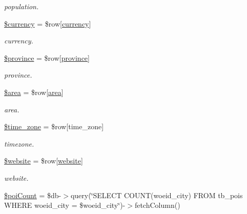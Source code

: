 \begin{DoxyCompactItemize}
\begin{DoxyCompactList}\small\item\em population. \end{DoxyCompactList}\item 
\mbox{\hyperlink{rotterdam_2index_8php_a37d22fd3b896e9d5488f3479a4d8f451}{\$currency}} = \$row\mbox{[}\textquotesingle{}\mbox{\hyperlink{index_8php_abd84e0698c321abdbf211d5b8425d0b5}{currency}}\textquotesingle{}\mbox{]}
\begin{DoxyCompactList}\small\item\em currency. \end{DoxyCompactList}\item 
\mbox{\hyperlink{rotterdam_2index_8php_a0bdd006d1becad76055fe31c887fdfaf}{\$province}} = \$row\mbox{[}\textquotesingle{}\mbox{\hyperlink{index_8php_a38d70414c65575df5643ad4296c9db2e}{province}}\textquotesingle{}\mbox{]}
\begin{DoxyCompactList}\small\item\em province. \end{DoxyCompactList}\item 
\mbox{\hyperlink{rotterdam_2index_8php_a460a08379d150f8c151a07ad9a3251cd}{\$area}} = \$row\mbox{[}\textquotesingle{}\mbox{\hyperlink{index_8php_a5198216176428aa2303311f956213f33}{area}}\textquotesingle{}\mbox{]}
\begin{DoxyCompactList}\small\item\em area. \end{DoxyCompactList}\item 
\mbox{\hyperlink{rotterdam_2index_8php_adce4610b55a895abff73b5ed259c4bd3}{\$time\+\_\+zone}} = \$row\mbox{[}\textquotesingle{}time\+\_\+zone\textquotesingle{}\mbox{]}
\begin{DoxyCompactList}\small\item\em timezone. \end{DoxyCompactList}\item 
\mbox{\hyperlink{rotterdam_2index_8php_a2887d41d3bb2498db735eeb87efa2d73}{\$website}} = \$row\mbox{[}\textquotesingle{}\mbox{\hyperlink{index_8php_a8c56014cff17c1ced653aa98455da680}{website}}\textquotesingle{}\mbox{]}
\begin{DoxyCompactList}\small\item\em website. \end{DoxyCompactList}\item 
\mbox{\hyperlink{rotterdam_2index_8php_a8fb5f82500861c51c8fcfd700321e59e}{\$poi\+Count}} = \$db-\/$>$query(\char`\"{}S\+E\+L\+E\+CT C\+O\+U\+NT(woeid\+\_\+city) F\+R\+OM tb\+\_\+pois W\+H\+E\+RE woeid\+\_\+city = \$woeid\+\_\+city\char`\"{})-\/$>$fetch\+Column()

\end{DoxyCompactItemize}
